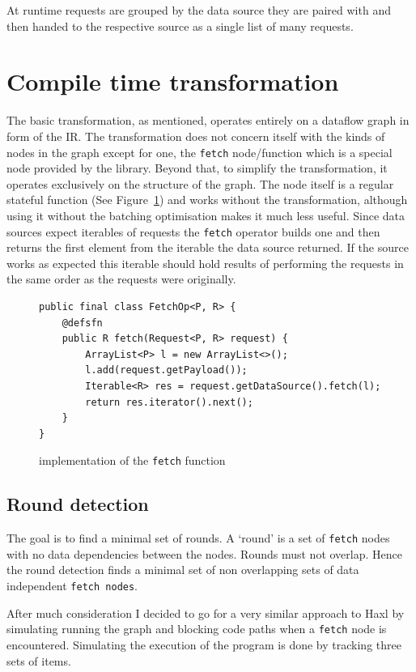 At runtime requests are grouped by the data source they are paired with and then handed to the respective source as a single list of many requests.

\section{Compile time transformation}

The basic \yauhau{} transformation, as mentioned, operates entirely on a dataflow graph in form of the IR.
The transformation does not concern itself with the kinds of nodes in the graph except for one, the \texttt{fetch} node/function which is a special node provided by the \yauhau{} library.
Beyond that, to simplify the transformation, it operates exclusively on the structure of the graph.
The \fetch{} node itself is a regular stateful function (See Figure~\ref{fig:fetch-implementation}) and works without the \yauhau{} transformation, although using it without the batching optimisation makes it much less useful.
Since data sources expect iterables of requests the \texttt{fetch} operator builds one and then returns the first element from the iterable the data source returned.
If the source works as expected this iterable should hold results of performing the requests in the same order as the requests were originally.

\begin{figure}
\begin{verbatim}
public final class FetchOp<P, R> {
    @defsfn
    public R fetch(Request<P, R> request) {
        ArrayList<P> l = new ArrayList<>();
        l.add(request.getPayload());
        Iterable<R> res = request.getDataSource().fetch(l);
        return res.iterator().next();
    }
}
\end{verbatim}
\caption{implementation of the \texttt{fetch} function}
\label{fig:fetch-implementation}
\end{figure}

\subsection{Round detection}

The goal is to find a minimal set of rounds.
A `round' is a set of \texttt{fetch} nodes with no data dependencies between the nodes.
Rounds must not overlap.
Hence the round detection finds a minimal set of non overlapping sets of data independent \texttt{fetch nodes}.

After much consideration I decided to go for a very similar approach to Haxl by simulating running the graph and blocking code paths when a \texttt{fetch} node is encountered.
Simulating the execution of the program is done by tracking three sets of items.

